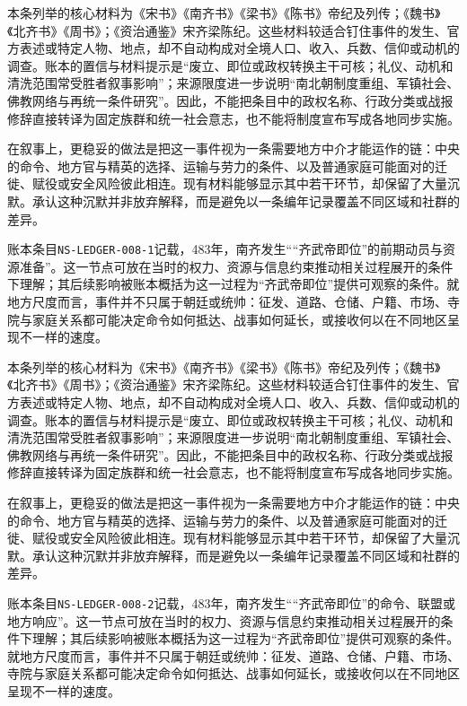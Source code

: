 本条列举的核心材料为《宋书》《南齐书》《梁书》《陈书》帝纪及列传；《魏书》《北齐书》《周书》；《资治通鉴》宋齐梁陈纪。这些材料较适合钉住事件的发生、官方表述或特定人物、地点，却不自动构成对全境人口、收入、兵数、信仰或动机的调查。账本的置信与材料提示是“废立、即位或政权转换主干可核；礼仪、动机和清洗范围常受胜者叙事影响”；来源限度进一步说明“南北朝制度重组、军镇社会、佛教网络与再统一条件研究”。因此，不能把条目中的政权名称、行政分类或战报修辞直接转译为固定族群和统一社会意志，也不能将制度宣布写成各地同步实施。

在叙事上，更稳妥的做法是把这一事件视为一条需要地方中介才能运作的链：中央的命令、地方官与精英的选择、运输与劳力的条件、以及普通家庭可能面对的迁徙、赋役或安全风险彼此相连。现有材料能够显示其中若干环节，却保留了大量沉默。承认这种沉默并非放弃解释，而是避免以一条编年记录覆盖不同区域和社群的差异。

账本条目\texttt{NS-LEDGER-008-1}记载，483年，南齐发生““齐武帝即位”的前期动员与资源准备”。这一节点可放在当时的权力、资源与信息约束推动相关过程展开的条件下理解；其后续影响被账本概括为这一过程为“齐武帝即位”提供可观察的条件。就地方尺度而言，事件并不只属于朝廷或统帅：征发、道路、仓储、户籍、市场、寺院与家庭关系都可能决定命令如何抵达、战事如何延长，或接收何以在不同地区呈现不一样的速度。

本条列举的核心材料为《宋书》《南齐书》《梁书》《陈书》帝纪及列传；《魏书》《北齐书》《周书》；《资治通鉴》宋齐梁陈纪。这些材料较适合钉住事件的发生、官方表述或特定人物、地点，却不自动构成对全境人口、收入、兵数、信仰或动机的调查。账本的置信与材料提示是“废立、即位或政权转换主干可核；礼仪、动机和清洗范围常受胜者叙事影响”；来源限度进一步说明“南北朝制度重组、军镇社会、佛教网络与再统一条件研究”。因此，不能把条目中的政权名称、行政分类或战报修辞直接转译为固定族群和统一社会意志，也不能将制度宣布写成各地同步实施。

在叙事上，更稳妥的做法是把这一事件视为一条需要地方中介才能运作的链：中央的命令、地方官与精英的选择、运输与劳力的条件、以及普通家庭可能面对的迁徙、赋役或安全风险彼此相连。现有材料能够显示其中若干环节，却保留了大量沉默。承认这种沉默并非放弃解释，而是避免以一条编年记录覆盖不同区域和社群的差异。

账本条目\texttt{NS-LEDGER-008-2}记载，483年，南齐发生““齐武帝即位”的命令、联盟或地方响应”。这一节点可放在当时的权力、资源与信息约束推动相关过程展开的条件下理解；其后续影响被账本概括为这一过程为“齐武帝即位”提供可观察的条件。就地方尺度而言，事件并不只属于朝廷或统帅：征发、道路、仓储、户籍、市场、寺院与家庭关系都可能决定命令如何抵达、战事如何延长，或接收何以在不同地区呈现不一样的速度。

